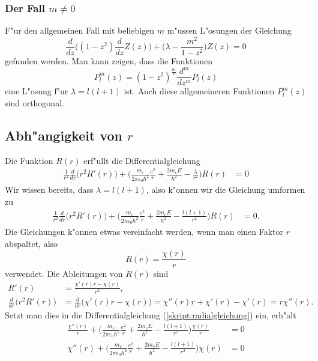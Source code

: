 \subsubsection{Der Fall $m\ne 0$}
F"ur den allgemeinen Fall mit beliebigen $m$ m"ussen L"osungen der
Gleichung
\begin{equation}
\frac{d}{dz}\biggl((1-z^2)\frac{d}{dz}Z(z)\biggr)
+\biggl(\lambda -\frac{m^2}{1-z^2}\biggr)Z(z)=0
\end{equation}
gefunden werden. Man kann zeigen, dass die Funktionen
\[
P_l^m(z)=
(1-z^2)^{\frac{m}2}\frac{d^m}{dz^m}P_l(z)
\]
eine L"osung f"ur $\lambda=l(l+1)$ ist.
Auch diese allgemeineren Funktionen $P_l^m(z)$ sind orthogonal.

\subsection{Abh"angigkeit von $r$}
%
%
Die Funktion $R(r)$ erf"ullt die Differentialgleichung
\begin{align}
\frac{1}{r^2}\frac{d}{dr}\bigl(r^2R'(r)\bigr)
+\biggl(\frac{m_e}{2\pi\varepsilon_0\hbar^2}\frac{e^2}{r}
+
\frac{2m_eE}{\hbar^2}
-\frac{\lambda}{r^2}
\biggr)R(r)
&=0
\label{skript:radialgleichung}
\end{align}
Wir wissen bereits, dass $\lambda=l(l+1)$, also k"onnen wir die
Gleichung umformen zu
\begin{align*}
\frac{1}{r^2}\frac{d}{dr}\bigl(r^2R'(r)\bigr)
+\biggl(\frac{m_e}{2\pi\varepsilon_0\hbar^2}\frac{e^2}{r}
+
\frac{2m_eE}{\hbar^2}
-\frac{l(l+1)}{r^2}
\biggr)R(r)
&=0.
\end{align*}
Die Gleichungen k"onnen etwas vereinfacht werden, wenn man einen
Faktor $r$ abspaltet, also 
\[
R(r)=\frac{\chi(r)}{r}
\]
verwendet.
Die Ableitungen von $R(r)$ sind
\begin{align*}
R'(r)&=\frac{\chi'(r)r-\chi(r)}{r^2},\\
\frac{d}{dr}\bigl(r^2R'(r)\bigr)
&=
\frac{d}{dr}\bigl(\chi'(r)r-\chi(r)\bigr)
=
\chi''(r)r+\chi'(r)-\chi'(r)=r\chi''(r).
\end{align*}
Setzt man dies in die Differentialgleichung (\ref{skript:radialgleichung}) ein,
erh"alt
\begin{align*}
\frac{\chi''(r)}{r}
+\biggl(\frac{m_e}{2\pi\varepsilon_0\hbar^2}\frac{e^2}{r}
+
\frac{2m_eE}{\hbar^2}
-\frac{l(l+1)}{r^2}
\biggr)\frac{\chi(r)}{r}
&=0
\\
\chi''(r)
+\biggl(\frac{m_e}{2\pi\varepsilon_0\hbar^2}\frac{e^2}{r}
+
\frac{2m_eE}{\hbar^2}
-\frac{l(l+1)}{r^2}
\biggr)\chi(r)
&=0
\end{align*}


